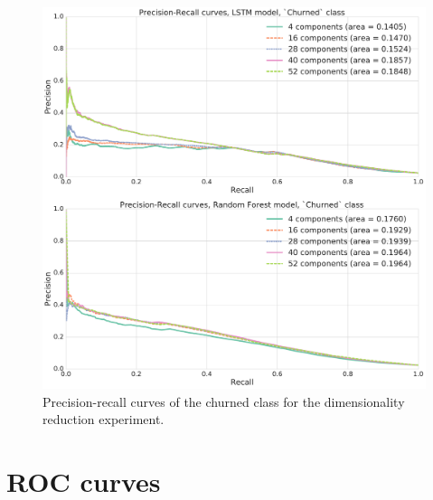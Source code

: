 \documentclass{kththesis}
\begin{document}
\begin{figure}
    \centering
    \includegraphics[width=1.0\textwidth,keepaspectratio]{figures/prc_dim_reduction.pdf}
    \caption{Precision-recall curves of the churned class for the dimensionality reduction experiment.}
    \label{fig:prc_dim_reduction}
\end{figure}

\section{ROC curves}
\end{document}
